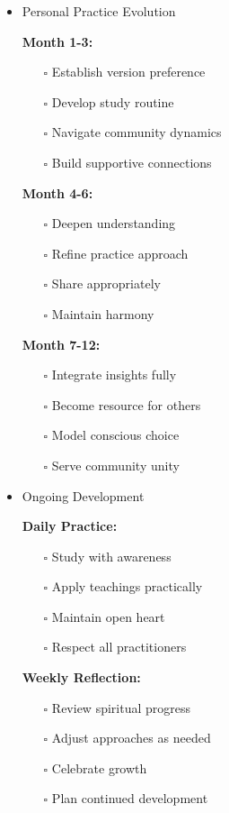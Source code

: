 \documentclass[11pt,twoside]{book}
\begin{document}
\begin{itemize}
\item Personal Practice Evolution
\label{sec:orgbf24970}

\textbf{\textbf{Month 1-3:}}
\begin{itemize}
\item[{$\square$}] Establish version preference
\item[{$\square$}] Develop study routine
\item[{$\square$}] Navigate community dynamics
\item[{$\square$}] Build supportive connections
\end{itemize}

\textbf{\textbf{Month 4-6:}}
\begin{itemize}
\item[{$\square$}] Deepen understanding
\item[{$\square$}] Refine practice approach
\item[{$\square$}] Share appropriately
\item[{$\square$}] Maintain harmony
\end{itemize}

\textbf{\textbf{Month 7-12:}}
\begin{itemize}
\item[{$\square$}] Integrate insights fully
\item[{$\square$}] Become resource for others
\item[{$\square$}] Model conscious choice
\item[{$\square$}] Serve community unity
\end{itemize}
\item Ongoing Development
\label{sec:org841c014}

\textbf{\textbf{Daily Practice:}}
\begin{itemize}
\item[{$\square$}] Study with awareness
\item[{$\square$}] Apply teachings practically
\item[{$\square$}] Maintain open heart
\item[{$\square$}] Respect all practitioners
\end{itemize}

\textbf{\textbf{Weekly Reflection:}}
\begin{itemize}
\item[{$\square$}] Review spiritual progress
\item[{$\square$}] Adjust approaches as needed
\item[{$\square$}] Celebrate growth
\item[{$\square$}] Plan continued development
\end{itemize}


\end{itemize}
\end{document}
